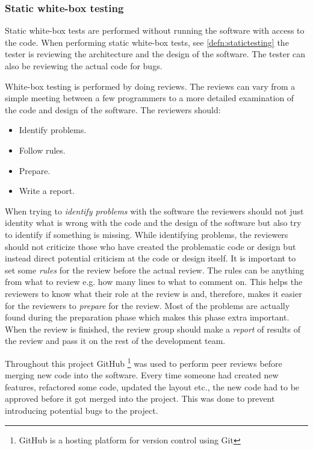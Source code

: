 \documentclass[../../master.tex]{subfiles}
\begin{document}
\subsubsection{Static white-box testing} \label{staticwhitebox}
Static white-box tests are performed without running the software with access to the code.
When performing static white-box tests, see \cref{defn:statictesting} the tester is reviewing the architecture and the design of the software.
The tester can also be reviewing the actual code for bugs. \cite{SoftwareTesting}

White-box testing is performed by doing reviews.
The reviews can vary from a simple meeting between a few programmers to a more detailed examination of the code and design of the software.
The reviewers should: \cite{SoftwareTesting}

\begin{itemize}
	\item Identify problems.
	\item Follow rules.
	\item Prepare.
	\item Write a report.
\end{itemize}

When trying to \textit{identify problems} with the software the reviewers should not just identity what is wrong with the code and the design of the software but also try to identify if something is missing.
While identifying problems, the reviewers should not criticize those who have created the problematic code or design but instead direct potential criticism at the code or design itself.
It is important to set some \textit{rules} for the review before the actual review.
The rules can be anything from what to review e.g. how many lines to what to comment on.
This helps the reviewers to know what their role at the review is and, therefore, makes it easier for the reviewers to \textit{prepare} for the review.
Most of the problems are actually found during the preparation phase which makes this phase extra important.
When the review is finished, the review group should make a \textit{report} of results of the review and pass it on the rest of the development team. \cite{SoftwareTesting}

Throughout this project GitHub \footnote{GitHub is a hosting platform for version control using Git} was used to perform peer reviews before merging new code into the software.
Every time someone had created new features, refactored some code, updated the layout etc., the new code had to be approved before it got merged into the project.
This was done to prevent introducing potential bugs to the project.
\end{document}
